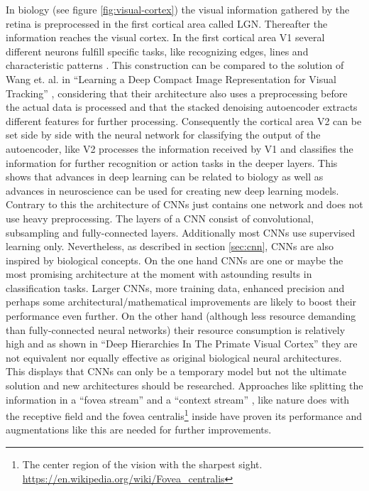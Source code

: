 \documentclass[12pt,twoside]{article}
\theoremstyle{plain}
\theoremstyle{definition}
\theoremstyle{remark}
\begin{document}
In biology (see figure \ref{fig:visual-cortex}) the visual information gathered by the retina is preprocessed in the first cortical area called LGN. Thereafter the information reaches the visual cortex. In the first cortical area V1 several different neurons fulfill specific tasks, like recognizing edges, lines and characteristic patterns \cite{HigherOrderVisualProcessing}. This construction can be compared to the solution of Wang et. al. in \enquote{Learning a Deep Compact Image Representation for Visual Tracking} \cite{LearningDeepCompactImageTracking-Wang}, considering that their architecture also uses a preprocessing before the actual data is processed and that the stacked denoising autoencoder extracts different features for further processing. Consequently the cortical area V2 can be set side by side with the neural network for classifying the output of the autoencoder, like V2 processes the information received by V1 and classifies the information for further recognition or action tasks in the deeper layers. This shows that advances in deep learning can be related to biology as well as advances in neuroscience can be used for creating new deep learning models.
\\
Contrary to this the architecture of CNNs just contains one network and does not use heavy preprocessing. The layers of a CNN consist of convolutional, subsampling and fully-connected layers. Additionally most CNNs use supervised learning only. Nevertheless, as described in section \ref{sec:cnn}, CNNs are also inspired by biological concepts.
On the one hand CNNs are one or maybe the most promising architecture at the moment \cite{GoogLeNet, ImangeNetClassificationCNN-Krizhevsky} with astounding results in classification tasks. Larger CNNs, more training data, enhanced precision and perhaps some architectural/mathematical improvements are likely to boost their performance even further.
On the other hand (although less resource demanding than fully-connected neural networks) their resource consumption is relatively high and as shown in \enquote{Deep Hierarchies In The Primate Visual Cortex} \cite{DeepHierarchiesVisualCortex-kruger} they are not equivalent nor equally effective as original biological neural architectures. This displays that CNNs can only be a temporary model but not the ultimate solution and new architectures should be researched. Approaches like splitting the information in a \enquote{fovea stream} and a \enquote{context stream} \cite{GoogleLargeScaleVideoClassification-Karpathy}, like nature does with the receptive field and the fovea centralis\footnote{The center region of the vision with the sharpest sight. \url{https://en.wikipedia.org/wiki/Fovea_centralis}} inside have proven its performance and augmentations like this are needed for further improvements.
\end{document}

